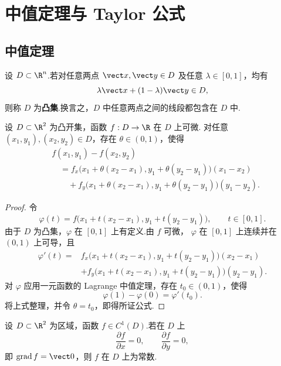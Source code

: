 \section{中值定理与 Taylor 公式}

\subsection*{中值定理}

\begin{definition}
	设 $D\subset\R^n$.若对任意两点 $\vect x,\vect y\in D$ 及任意
	$\lambda\in[0,1]$，均有
	\[
	\lambda\vect x+(1-\lambda)\vect y\in D,
	\]
	则称 $D$ 为\textbf{凸集}.换言之，$D$ 中任意两点之间的线段都包含在 $D$ 中.
\end{definition}

\begin{theorem}
	设 $D\subset\R^2$ 为凸开集，函数 $f:D\to\R$ 在 $D$ 上可微.
	对任意 $(x_1,y_1),(x_2,y_2)\in D$，存在 $\theta\in(0,1)$，使得
	\[
	\begin{aligned}
	&f(x_1,y_1)-f(x_2,y_2)\\
	&\quad=
	f_x\bigl(x_1+\theta(x_2-x_1),y_1+\theta(y_2-y_1)\bigr)(x_1-x_2)\\
	&\qquad+
	f_y\bigl(x_1+\theta(x_2-x_1),y_1+\theta(y_2-y_1)\bigr)(y_1-y_2).
	\end{aligned}
	\]
\end{theorem}

\begin{proof}
	令
	\[
	\varphi(t)
	=
	f\bigl(x_1+t(x_2-x_1),y_1+t(y_2-y_1)\bigr),
	\qquad t\in[0,1].
	\]
	由于 $D$ 为凸集，$\varphi$ 在 $[0,1]$ 上有定义.由 $f$ 可微，
	$\varphi$ 在 $[0,1]$ 上连续并在 $(0,1)$ 上可导，且
	\[
	\begin{aligned}
	\varphi'(t)
	={}&
	f_x\bigl(x_1+t(x_2-x_1),y_1+t(y_2-y_1)\bigr)(x_2-x_1)\\
	&+
	f_y\bigl(x_1+t(x_2-x_1),y_1+t(y_2-y_1)\bigr)(y_2-y_1).
	\end{aligned}
	\]
	对 $\varphi$ 应用一元函数的 Lagrange 中值定理，存在 $t_0\in(0,1)$，使得
	\[
	\varphi(1)-\varphi(0)=\varphi'(t_0).
	\]
	将上式整理，并令 $\theta=t_0$，即得所证公式.
\end{proof}

\begin{proposition}
	设 $D\subset\R^2$ 为区域，函数 $f\in C^1(D)$.若在 $D$ 上
	\[
	\frac{\partial f}{\partial x}=0,
	\qquad
	\frac{\partial f}{\partial y}=0,
	\]
	即 $\operatorname{grad}f=\vect 0$，则 $f$ 在 $D$ 上为常数.
\end{proposition}

